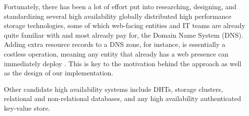 Fortunately, there has been a lot of effort put into researching, designing, and
standardizing several high availability globally distributed high performance
storage technologies, some of which web-facing entities and IT teams are already
quite familiar with and most already pay for, \eg the Domain Name System (DNS).
Adding extra resource records to a DNS zone, for instance, is essentially a
costless operation, meaning any entity that already has a web presence can
immediately deploy \SYSTEM{}. This is key to the motivation behind the \SYSTEM{}
approach as well as the design of our \DNSSYS{} implementation.

Other candidate high availability systems include DHTs, storage clusters,
relational and non-relational databases, and any high availability authenticated
key-value store.

